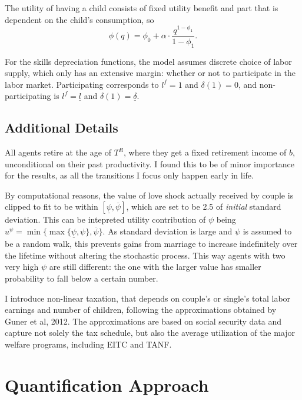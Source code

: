 \documentclass[12pt,letter]{article}
\begin{document}
The utility of having a child consists of fixed utility benefit and part that is dependent on the child's consumption, so
\begin{equation}\label{child-q}\phi(q) = \phi_0 + \alpha\cdot \frac{q^{1-\phi_1}}{1-\phi_1}.\end{equation}

For the skills depreciation functions, the model assumes discrete choice of labor supply, which only has an extensive margin: whether or not to participate in the labor market. Participating corresponds to $l^f = 1$ and $\delta(1) = 0$, and non-participating is $l^f = \underline{l}$ and $\delta(1) = \underline{\delta}$. 




\subsection{Additional Details}
All agents retire at the age of $T^R$, where they get a fixed retirement income of $b$, unconditional on their past productivity. I found this to be of minor importance for the results, as all the transitions I focus only happen early in life.

By computational reasons, the value of love shock actually received by couple is clipped to fit to be within $[\underline{\psi},\overline{\psi}]$, which are set to be 2.5 of \emph{initial} standard deviation. This can be intepreted utility contribution of $\psi$ being $u^{\psi} = \min\{\max\{ \underline{\psi}, \psi \},\overline{\psi}\}$. As standard deviation is large and $\psi$ is assumed to be a random walk, this prevents gains from marriage to increase indefinitely over the lifetime without altering the stochastic process. This way agents with two very high $\psi$ are still different: the one with the larger value has smaller probability to fall below a certain number.

I introduce non-linear taxation, that depends on couple's or single's total labor earnings and number of children, following the approximations obtained by Guner et al, 2012\nocite{guner2012taxation}. The approximations are based on social security data and capture not solely the tax schedule, but also the average utilization of the major welfare programs, including EITC and TANF.

\section{Quantification Approach}
\end{document}
